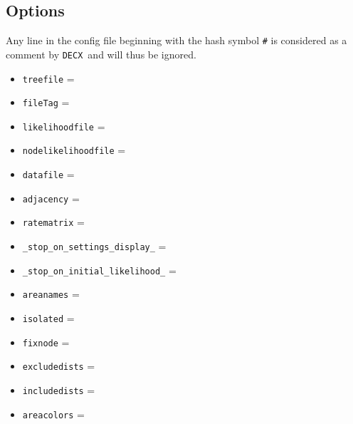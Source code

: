 \documentclass[12pt,a4]{article}
\newcommand{\DECX}{\texttt{DECX}}
\begin{document}
\subsection{Options}
Any line in the config file beginning with the hash symbol \texttt{\#} is considered as a comment by \DECX\ and will thus be ignored.
\begin{itemize}
\item \texttt{treefile} =\\

\item \texttt{fileTag} =\\

\item \texttt{likelihoodfile} =\\

\item \texttt{nodelikelihoodfile} =\\

\item \texttt{datafile} =\\

\item \texttt{adjacency} =\\

\item \texttt{ratematrix} =\\

\item \texttt{\_stop\_on\_settings\_display\_} =\\

\item \texttt{\_stop\_on\_initial\_likelihood\_} =\\

\item \texttt{areanames} =\\

\item \texttt{isolated} =\\

\item \texttt{fixnode} =\\

\item \texttt{excludedists} =\\

\item \texttt{includedists} =\\

\item \texttt{areacolors} =\\


\end{itemize}
\end{document}
